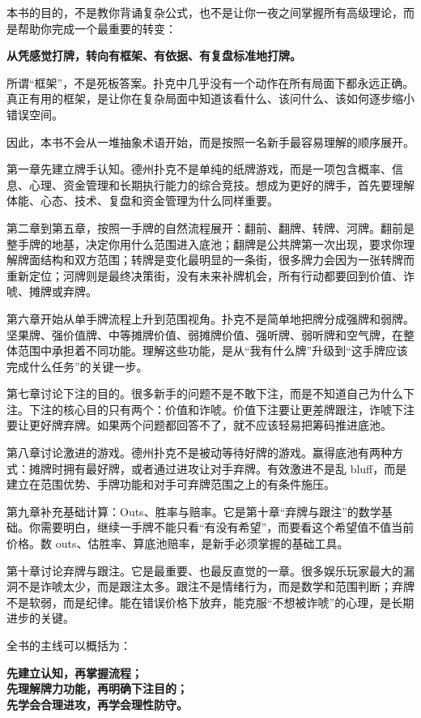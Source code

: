 \documentclass[UTF8,openany,zihao=-4]{ctexbook}
\begin{document}
本书的目的，不是教你背诵复杂公式，也不是让你一夜之间掌握所有高级理论，而是帮助你完成一个最重要的转变：

\begin{center}
\textbf{从凭感觉打牌，转向有框架、有依据、有复盘标准地打牌。}
\end{center}

所谓“框架”，不是死板答案。扑克中几乎没有一个动作在所有局面下都永远正确。真正有用的框架，是让你在复杂局面中知道该看什么、该问什么、该如何逐步缩小错误空间。

因此，本书不会从一堆抽象术语开始，而是按照一名新手最容易理解的顺序展开。

第一章先建立牌手认知。德州扑克不是单纯的纸牌游戏，而是一项包含概率、信息、心理、资金管理和长期执行能力的综合竞技。想成为更好的牌手，首先要理解体能、心态、技术、复盘和资金管理为什么同样重要。

第二章到第五章，按照一手牌的自然流程展开：翻前、翻牌、转牌、河牌。翻前是整手牌的地基，决定你用什么范围进入底池；翻牌是公共牌第一次出现，要求你理解牌面结构和双方范围；转牌是变化最明显的一条街，很多牌力会因为一张转牌而重新定位；河牌则是最终决策街，没有未来补牌机会，所有行动都要回到价值、诈唬、摊牌或弃牌。

第六章开始从单手牌流程上升到范围视角。扑克不是简单地把牌分成强牌和弱牌。坚果牌、强价值牌、中等摊牌价值、弱摊牌价值、强听牌、弱听牌和空气牌，在整体范围中承担着不同功能。理解这些功能，是从“我有什么牌”升级到“这手牌应该完成什么任务”的关键一步。

第七章讨论下注的目的。很多新手的问题不是不敢下注，而是不知道自己为什么下注。下注的核心目的只有两个：价值和诈唬。价值下注要让更差牌跟注，诈唬下注要让更好牌弃牌。如果两个问题都回答不了，就不应该轻易把筹码推进底池。

第八章讨论激进的游戏。德州扑克不是被动等待好牌的游戏。赢得底池有两种方式：摊牌时拥有最好牌，或者通过进攻让对手弃牌。有效激进不是乱 bluff，而是建立在范围优势、手牌功能和对手可弃牌范围之上的有条件施压。

第九章补充基础计算：Outs、胜率与赔率。它是第十章“弃牌与跟注”的数学基础。你需要明白，继续一手牌不能只看“有没有希望”，而要看这个希望值不值当前价格。数 outs、估胜率、算底池赔率，是新手必须掌握的基础工具。

第十章讨论弃牌与跟注。它是最重要、也最反直觉的一章。很多娱乐玩家最大的漏洞不是诈唬太少，而是跟注太多。跟注不是情绪行为，而是数学和范围判断；弃牌不是软弱，而是纪律。能在错误价格下放弃，能克服“不想被诈唬”的心理，是长期进步的关键。

全书的主线可以概括为：

\begin{center}
\textbf{先建立认知，再掌握流程；\\
先理解牌力功能，再明确下注目的；\\
先学会合理进攻，再学会理性防守。}
\end{center}
\end{document}
